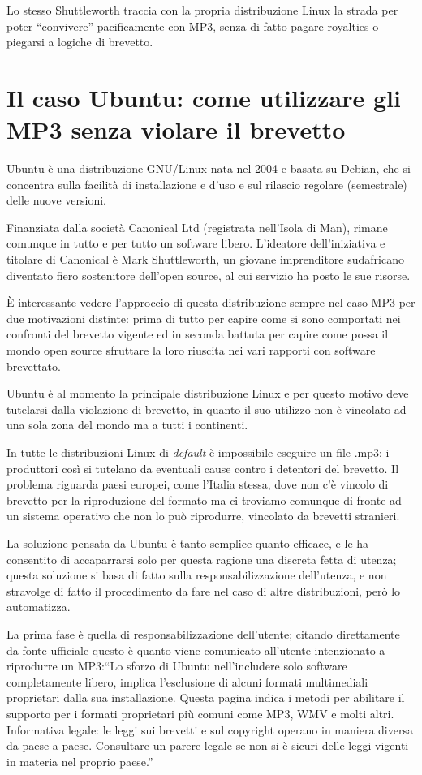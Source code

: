 Lo stesso Shuttleworth traccia con la propria distribuzione Linux la strada per poter ``convivere'' pacificamente con MP3, senza di fatto pagare royalties o piegarsi a logiche di brevetto.
\section{Il caso Ubuntu: come utilizzare gli MP3 senza violare il brevetto}
Ubuntu è una distribuzione GNU/Linux nata nel 2004 e basata su Debian, che si concentra sulla facilità di installazione e d'uso e sul rilascio regolare (semestrale) delle nuove versioni. 

Finanziata dalla società Canonical Ltd (registrata nell'Isola di Man), rimane comunque in tutto e per tutto un software libero. L'ideatore dell'iniziativa e titolare di Canonical è Mark Shuttleworth, un giovane imprenditore sudafricano diventato fiero sostenitore dell'open source, al cui servizio ha posto le sue risorse.

\`E interessante vedere l'approccio di questa distribuzione sempre nel caso MP3 per due motivazioni distinte: prima di tutto per capire come si sono comportati nei confronti del brevetto vigente ed in seconda battuta per capire come possa il mondo open source sfruttare la loro riuscita nei vari rapporti con software brevettato.

Ubuntu è al momento la principale distribuzione Linux e per questo motivo deve tutelarsi dalla violazione di brevetto, in quanto il suo utilizzo non è vincolato ad una sola zona del mondo ma a tutti i continenti.

In tutte le distribuzioni Linux di \textit{default} è impossibile eseguire un file .mp3; i produttori così si tutelano da eventuali cause contro i detentori del brevetto. Il problema riguarda paesi europei, come l'Italia stessa, dove non c'è vincolo di brevetto per la riproduzione del formato ma ci troviamo comunque di fronte ad un sistema operativo che non lo può riprodurre, vincolato da brevetti stranieri. 

La soluzione pensata da Ubuntu è tanto semplice quanto efficace, e le ha consentito di accaparrarsi solo per questa ragione una discreta fetta di utenza; questa soluzione si basa di fatto sulla responsabilizzazione dell'utenza, e non stravolge di fatto il procedimento da fare nel caso di altre distribuzioni, però lo automatizza.

La prima fase è quella di responsabilizzazione dell'utente; citando direttamente da fonte ufficiale questo è quanto viene comunicato all'utente intenzionato a riprodurre un MP3:``Lo sforzo di Ubuntu nell'includere solo software completamente libero, implica l'esclusione di alcuni formati multimediali proprietari dalla sua installazione. Questa pagina indica i metodi per abilitare il supporto per i formati proprietari più comuni come MP3, WMV e molti altri. Informativa legale: le leggi sui brevetti e sul copyright operano in maniera diversa da paese a paese. Consultare un parere legale se non si è sicuri delle leggi vigenti in materia nel proprio paese.''

